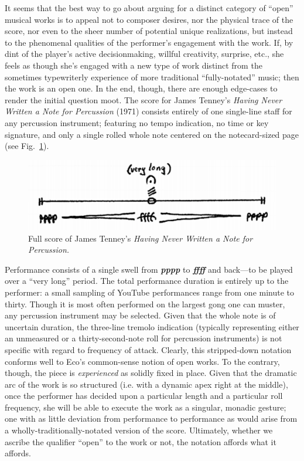     It seems that the best way to go about arguing for a distinct category of ``open'' musical works is to appeal not to composer desires, nor the physical trace of the score, nor even to the sheer number of potential unique realizations, but instead to the phenomenal qualities of the performer's engagement with the work. If, by dint of the player's active decisionmaking, willful creativity, surprise, etc., she feels as though she's engaged with a new type of work distinct from the sometimes typewriterly experience of more traditional ``fully-notated'' music; then the work is an open one. In the end, though, there are enough edge-cases to render the initial question moot. The score for James Tenney's \textit{Having Never Written a Note for Percussion} (1971) consists entirely of one single-line staff for any percussion instrument; featuring no tempo indication, no time or key signature, and only a single rolled whole note centered on the notecard-sized page (see Fig.~\ref{fig:tenney}). 

            \begin{figure} 
            \centering
            \includegraphics[width=.8\textwidth]{images/chapter2/tenney.png}
            \captionsetup{width=.5\textwidth}
            \caption[Full score of James Tenney's \textit{Having Never Written a Note for Percussion.}]{Full score of James Tenney's \textit{Having Never Written a Note for Percussion.}\footnotemark}
            \label{fig:tenney}
        \end{figure}

    Performance consists of a single swell from \textbf{\textit{pppp}} to \textbf{\textit{ffff}} and back---to be played over a ``very long'' period. The total performance duration is entirely up to the performer: a small sampling of YouTube performances range from one minute to thirty. Though it is most often performed on the largest gong one can muster, any percussion instrument may be selected. Given that the whole note is of uncertain duration, the three-line tremolo indication (typically representing either an unmeasured or a thirty-second-note roll for percussion instruments) is not specific with regard to frequency of attack. Clearly, this stripped-down notation conforms well to Eco's common-sense notion of open works. To the contrary, though, the piece is \textit{experienced} as solidly fixed in place. Given that the dramatic arc of the work is so structured (i.e. with a dynamic apex right at the middle), once the performer has decided upon a particular length and a particular roll frequency, she will be able to execute the work as a singular, monadic gesture; one with as little deviation from performance to performance as would arise from a wholly-traditionally-notated version of the score. Ultimately, whether we ascribe the qualifier ``open'' to the work or not, the notation affords what it affords.

